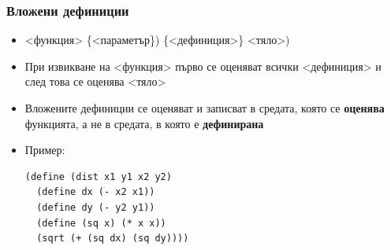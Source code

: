 \documentclass{beamer}
\begin{document}
\begin{frame}[fragile]
  \frametitle{Вложени дефиниции}

  \begin{itemize}
  \item {}<функция> \{<параметър\}\tta) \{<дефиниция>\} <тяло>\tta)
  \item При извикване на <функция> първо се оценяват всички <дефиниция> и след това се оценява <тяло>
  \item Вложените дефиниции се оценяват и записват в средата, която се \textbf{оценява} функцията, а не в средата, в която е \textbf{дефинирана}
  \item Пример:\\
\begin{verbatim}
(define (dist x1 y1 x2 y2)
  (define dx (- x2 x1))
  (define dy (- y2 y1))
  (define (sq x) (* x x))
  (sqrt (+ (sq dx) (sq dy))))
\end{verbatim}
  \end{itemize}
\end{frame}
\end{document}
